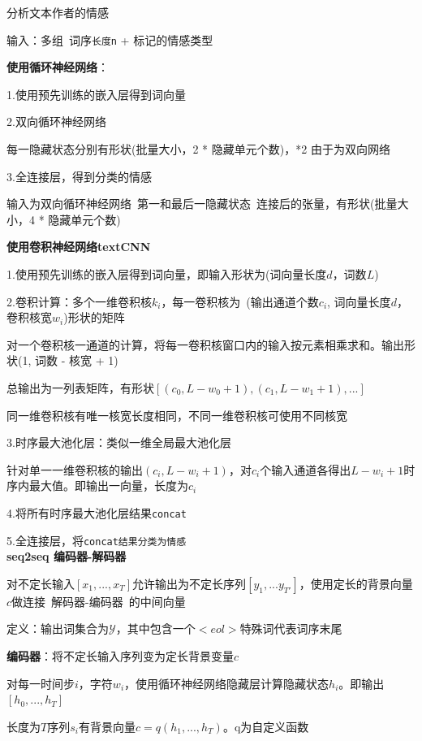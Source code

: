 \documentclass[UTF8]{ctexart}
\begin{document}
  分析文本作者的情感

  输入：多组\ 词序\texttt{长度n} + 标记的情感类型

  \textbf{使用循环神经网络}：

  \quad 1.使用预先训练的嵌入层得到词向量

  \quad 2.双向循环神经网络

  \quad \quad 每一隐藏状态分别有形状(批量大小，2 * 隐藏单元个数)，*2 由于为双向网络

  \quad 3.全连接层，得到分类的情感

  \quad \quad 输入为双向循环神经网络\ 第一和最后一隐藏状态\ 连接后的张量，有形状(批量大小，4 * 隐藏单元个数)

  \textbf{使用卷积神经网络textCNN}

  \quad 1.使用预先训练的嵌入层得到词向量，即输入形状为(词向量长度$d$，词数$L$)

  \quad 2.卷积计算：多个一维卷积核$k_i$，每一卷积核为\ (输出通道个数$c_i$, 词向量长度$d$，卷积核宽$w_i$)形状的矩阵

  \quad \quad 对一个卷积核一通道的计算，将每一卷积核窗口内的输入按元素相乘求和。输出形状(1, 词数 - 核宽 + 1)

  \quad \quad 总输出为一列表矩阵，有形状$[(c_0, L - w_0 + 1), (c_1, L - w_1 + 1), ...]$

  \quad \quad 同一维卷积核有唯一核宽长度相同，不同一维卷积核可使用不同核宽

  \quad 3.时序最大池化层：类似一维全局最大池化层
  
  \quad \quad 针对单一一维卷积核的输出$(c_i, L - w_i + 1)$，对$c_i$个输入通道各得出$L - w_i + 1$时序内最大值。即输出一向量，长度为$c_i$
  
  \quad 4.将所有时序最大池化层结果\texttt{concat}

  \quad 5.全连接层，将\texttt{concat结果分类为情感}\\
\textbf{seq2seq 编码器-解码器}

  对不定长输入$[x_1, ..., x_T]$允许输出为不定长序列$[y_1,...y_{T'}]$，使用定长的背景向量$c$做连接\ 解码器-编码器\ 的中间向量

  定义：输出词集合为$\mathcal{Y} $，其中包含一个$<eol>$特殊词代表词序末尾

  \textbf{编码器}：将不定长输入序列变为定长背景变量$c$

  \quad 对每一时间步$i$，字符$w_i$，使用循环神经网络隐藏层计算隐藏状态$h_i$。即输出$[h_0, ..., h_T]$

  \quad 长度为$T$序列$s_i$有背景向量$c = q(h_1, ..., h_T)$。q为自定义函数
\end{document}
